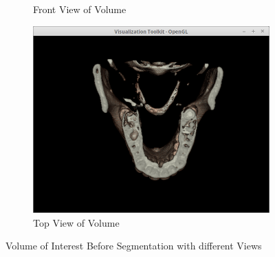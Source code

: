 \documentclass[10pt, b5paper]{article}
\begin{document}
\begin{figure}
\begin{subfigure}[b]{0.33\textwidth}
        \caption{Front View of Volume}
    \end{subfigure}
      \hfill
    \begin{subfigure}[b]{0.33\textwidth}
        \centering
        \includegraphics[width=\textwidth]{BST}
        \caption{Top View of Volume}
    \end{subfigure}
    \caption{Volume of Interest Before Segmentation with different Views}
    \label{fig:BS}
\end{figure}
\end{document}
